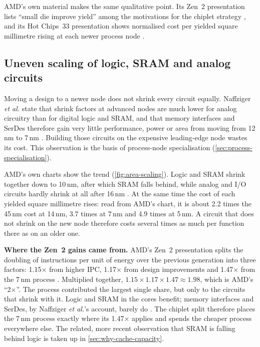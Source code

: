 

AMD's own material makes the same qualitative point. Its Zen~2 presentation lists ``small die improve yield'' among the motivations for the chiplet strategy \cite{suggs2019zen2}, and its Hot Chips~33 presentation shows normalised cost per yielded square millimetre rising at each newer process node \cite{swaminathanAdvancedPackagingEnabling2021}.

\subsection{Uneven scaling of logic, SRAM and analog circuits}
\label{sec:uneven-scaling}
Moving a design to a newer node does not shrink every circuit equally. Naffziger \emph{et al.} state that shrink factors at advanced nodes are much lower for analog circuitry than for digital logic and SRAM, and that memory interfaces and SerDes therefore gain very little performance, power or area from moving from 12\,nm to 7\,nm \cite{naffziger2020chiplet}. Building those circuits on the expensive leading-edge node wastes its cost. This observation is the basis of process-node specialisation (\cref{sec:process-specialisation}).

AMD's own charts show the trend (\cref{fig:area-scaling}). Logic and SRAM shrink together down to 10\,nm, after which SRAM falls behind, while analog and I/O circuits hardly shrink at all after 16\,nm \cite[slide~6]{wuu2022vcache}. At the same time the cost of each yielded square millimetre rises: read from AMD's chart, it is about 2.2 times the 45\,nm cost at 14\,nm, 3.7 times at 7\,nm and 4.9 times at 5\,nm. A circuit that does not shrink on the new node therefore costs several times as much per function there as on an older one.



\textbf{Where the Zen~2 gains came from.} AMD's Zen~2 presentation splits the doubling of instructions per unit of energy over the previous generation into three factors: 1.15$\times$ from higher IPC, 1.17$\times$ from design improvements and 1.47$\times$ from the 7\,nm process \cite[slide~4]{suggs2019zen2}. Multiplied together, $1.15 \times 1.17 \times 1.47 \approx 1.98$, which is AMD's ``2$\times$''. The process contributed the largest single share, but only to the circuits that shrink with it. Logic and SRAM in the cores benefit; memory interfaces and SerDes, by Naffziger \emph{et al.}'s account, barely do \cite{naffziger2020chiplet}. The chiplet split therefore places the 7\,nm process exactly where its 1.47$\times$ applies and spends the cheaper process everywhere else. The related, more recent observation that SRAM is falling behind logic is taken up in \cref{sec:why-cache-capacity}.

